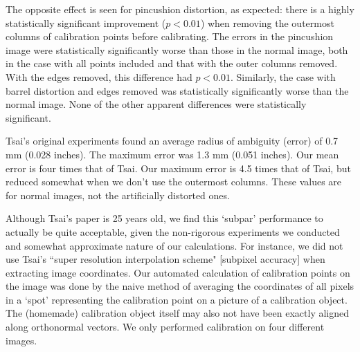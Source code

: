 The opposite effect is seen for pincushion distortion, as expected: there is a highly statistically significant improvement ($p < 0.01$) when removing the outermost columns of calibration points before calibrating. The errors in the pincushion image were statistically significantly worse than those in the normal image, both in the case with all points included and that with the outer columns removed. With the edges removed, this difference had $p < 0.01$. Similarly, the case with barrel distortion and edges removed was statistically significantly worse than the normal image. None of the other apparent differences were statistically significant.

Tsai's original experiments found an average radius of ambiguity (error) of 0.7 mm (0.028 inches). The maximum error was 1.3 mm (0.051 inches). Our mean error is four times that of Tsai. \cite{TSAI} Our maximum error is 4.5 times that of Tsai, but reduced somewhat when we don't use the outermost columns. These values are for normal images, not the artificially distorted ones.

Although Tsai's paper is 25 years old, we find this `subpar' performance to actually be quite acceptable, given the non-rigorous experiments we conducted and somewhat approximate nature of our calculations. For instance, we did not use Tsai's ``super resolution interpolation scheme" [subpixel accuracy] when extracting image coordinates. Our automated calculation of calibration points on the image was done by the naive method of averaging the coordinates of all pixels in a `spot' representing the calibration point on a picture of a calibration object. The (homemade) calibration object itself may also not have been exactly aligned along orthonormal vectors. We only performed calibration on four different images.

